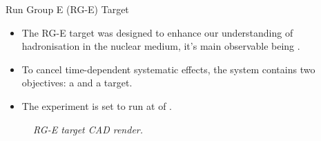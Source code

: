 \begin{frame}{Run Group E (RG-E) Target}
    \label{10.21::rge_target}

    \begin{itemize}
        \item
            The RG-E target was designed to enhance our understanding of hadronisation in the nuclear medium, it's main observable being .

        \item
            To cancel time-dependent systematic effects, the system contains two objectives: a  and a  target.

        \item
            The experiment is set to run at  of .
    \end{itemize}

    \begin{center}
        \begin{figure}[t]

            \scriptsize{\textit{
                RG-E target CAD render.
            }}
        \end{figure}
    \end{center}
\end{frame}

%
%
%
